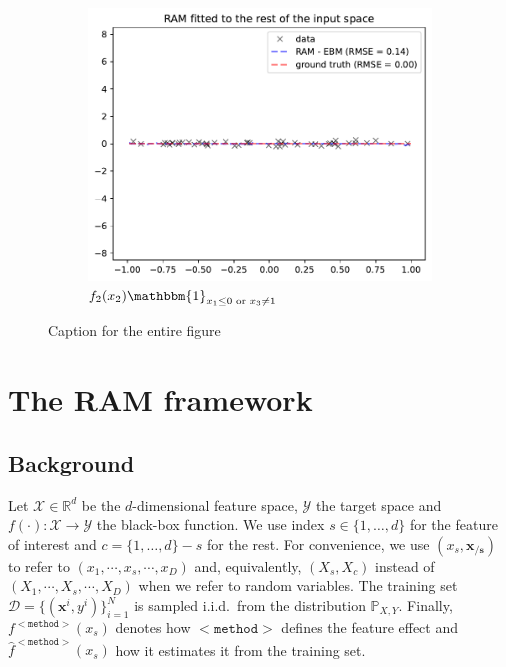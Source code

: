 \documentclass[12pt]{article}
\newcommand{\Rd}{\mathbb{R}^d}
\newcommand{\xb}{\mathbf{x}}
\newcommand{\xcc}{\mathbf{x_{/s}}}
\newcommand{\Xcal}{\mathcal{X}}
\newcommand{\Ycal}{\mathcal{Y}}
\newcommand{\when}[1]{\mathbbm{1}_{#1}}
\begin{document}
\begin{figure}[htbp]
\begin{subfigure}{0.32\textwidth}
    \end{subfigure}
    \begin{subfigure}{0.32\textwidth}
        \centering
        \includegraphics[width=\textwidth]{figures/regional_gam_subreg_2}
        \caption{\(f_2(x_2) \when{x_1 \leq 0 \text{ or } x_3 \neq 1}\)}
        \label{subfig:regional_gam_2}
    \end{subfigure}
    \caption{Caption for the entire figure}
    \label{fig:ram_example}
\end{figure}


\section{The RAM framework}

\subsection{Background}

Let \(\Xcal \in \Rd\) be the \(d\)-dimensional feature space, \(\Ycal\) the target space and \(f(\cdot) : \Xcal \rightarrow \Ycal\) the black-box function.  We use index \(s \in \{1, \ldots, d\}\) for the feature of interest and \(c = \{1, \ldots, d\} - s\) for the rest.
For convenience, we use \((x_s, \xcc)\) to refer to \((x_1, \cdots , x_s, \cdots, x_D)\) and, equivalently, \((X_s, X_c)\) instead of \((X_1, \cdots , X_s, \cdots, X_D)\) when we refer to random variables.
The training set \(\mathcal{D} = \{(\xb^i, y^i)\}_{i=1}^N\) is sampled
i.i.d.\ from the distribution \(\mathbb{P}_{X,Y}\).  Finally,
\(f^{\mathtt{<method>}}(x_s)\) denotes how \(\mathtt{<method>}\)
defines the feature effect and \(\hat{f}^{\mathtt{<method>}}(x_s)\)
how it estimates it from the training set.
\end{document}
